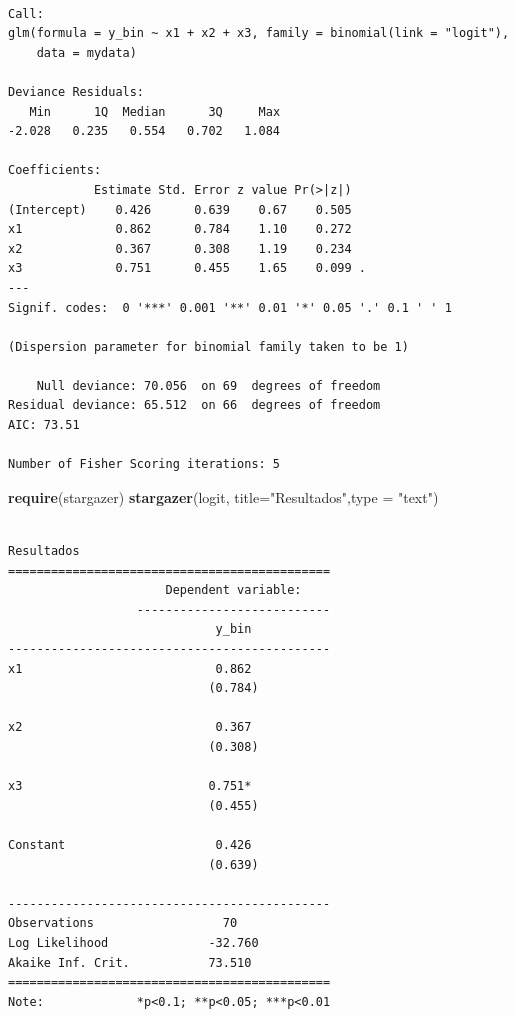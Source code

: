 \documentclass[12pt,brazil,oneside]{book}
\newenvironment{Shaded}{\begin{snugshade}}{\end{snugshade}}
\newcommand{\DataTypeTok}[1]{\textcolor[rgb]{0.13,0.29,0.53}{#1}}
\newcommand{\KeywordTok}[1]{\textcolor[rgb]{0.13,0.29,0.53}{\textbf{#1}}}
\newcommand{\NormalTok}[1]{#1}
\newcommand{\StringTok}[1]{\textcolor[rgb]{0.31,0.60,0.02}{#1}}
\begin{document}
\begin{verbatim}

Call:
glm(formula = y_bin ~ x1 + x2 + x3, family = binomial(link = "logit"), 
    data = mydata)

Deviance Residuals: 
   Min      1Q  Median      3Q     Max  
-2.028   0.235   0.554   0.702   1.084  

Coefficients:
            Estimate Std. Error z value Pr(>|z|)  
(Intercept)    0.426      0.639    0.67    0.505  
x1             0.862      0.784    1.10    0.272  
x2             0.367      0.308    1.19    0.234  
x3             0.751      0.455    1.65    0.099 .
---
Signif. codes:  0 '***' 0.001 '**' 0.01 '*' 0.05 '.' 0.1 ' ' 1

(Dispersion parameter for binomial family taken to be 1)

    Null deviance: 70.056  on 69  degrees of freedom
Residual deviance: 65.512  on 66  degrees of freedom
AIC: 73.51

Number of Fisher Scoring iterations: 5
\end{verbatim}

\begin{Shaded}
\begin{Highlighting}[]
\KeywordTok{require}\NormalTok{(stargazer)}
\KeywordTok{stargazer}\NormalTok{(logit, }\DataTypeTok{title=}\StringTok{"Resultados"}\NormalTok{,}\DataTypeTok{type =} \StringTok{"text"}\NormalTok{)}
\end{Highlighting}
\end{Shaded}

\begin{verbatim}

Resultados
=============================================
                      Dependent variable:    
                  ---------------------------
                             y_bin           
---------------------------------------------
x1                           0.862           
                            (0.784)          
                                             
x2                           0.367           
                            (0.308)          
                                             
x3                          0.751*           
                            (0.455)          
                                             
Constant                     0.426           
                            (0.639)          
                                             
---------------------------------------------
Observations                  70             
Log Likelihood              -32.760          
Akaike Inf. Crit.           73.510           
=============================================
Note:             *p<0.1; **p<0.05; ***p<0.01
\end{verbatim}
\end{document}

